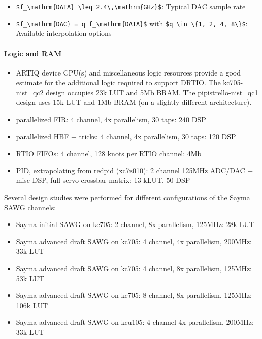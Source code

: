\begin{itemize}
	\item
	\texttt{\$f\_\textbackslash{}mathrm\{DATA\}\ \textbackslash{}leq\ 2.4\textbackslash{},\textbackslash{}mathrm\{GHz\}\$}:
	Typical DAC sample rate
	\item
	\texttt{\$f\_\textbackslash{}mathrm\{DAC\}\ =\ q\ f\_\textbackslash{}mathrm\{DATA\}\$}
	with
	\texttt{\$q\ \textbackslash{}in\ \textbackslash{}\{1,\ 2,\ 4,\ 8\textbackslash{}\}\$}:
	Available interpolation options
\end{itemize}

\paragraph{Logic and RAM}\label{logic-and-ram}

\begin{itemize}
	\item
	ARTIQ device CPU(s) and miscellaneous logic resources provide a good
	estimate for the additional logic required to support DRTIO. The
	kc705-nist\_qc2 design occupies 23k LUT and 5Mb BRAM. The
	pipistrello-nist\_qc1 design uses 15k LUT and 1Mb BRAM (on a slightly
	different architecture).
	\item
	parallelized FIR: 4 channel, 4x parallelism, 30 taps: 240 DSP
	\item
	parallelized HBF + tricks: 4 channel, 4x parallelism, 30 taps: 120 DSP
	\item
	RTIO FIFOs: 4 channel, 128 knots per RTIO channel: 4Mb
	\item
	PID, extrapolating from redpid (xc7z010): 2 channel 125MHz ADC/DAC +
	misc DSP, full servo crossbar matrix: 13 kLUT, 50 DSP
\end{itemize}

Several design studies were performed for different configurations of
the Sayma SAWG channels:

\begin{itemize}
	\item
	Sayma initial SAWG on kc705: 2 channel, 8x parallelism, 125MHz: 28k
	LUT
	\item
	Sayma advanced draft SAWG on kc705: 4 channel, 4x parallelism, 200MHz:
	33k LUT
	\item
	Sayma advanced draft SAWG on kc705: 4 channel, 8x parallelism, 125MHz:
	53k LUT
	\item
	Sayma advanced draft SAWG on kc705: 8 channel, 8x parallelism, 125MHz:
	106k LUT
	\item
	Sayma advanced draft SAWG on kcu105: 4 channel 4x parallelism, 200MHz:
	33k LUT
\end{itemize}

